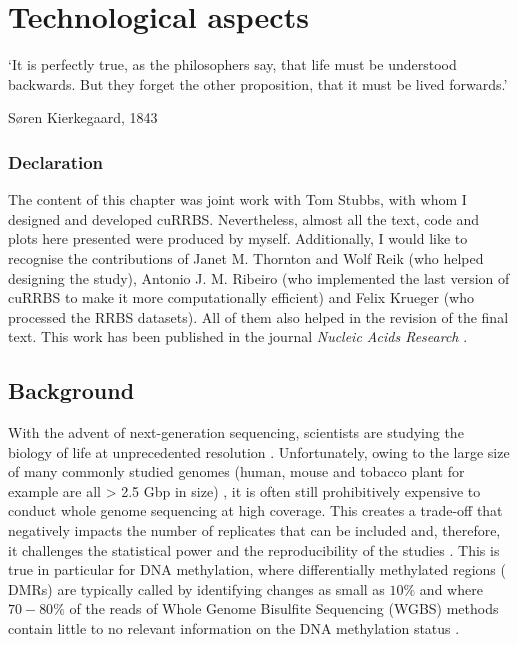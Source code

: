 
\chapter{Technological aspects} \label{c:4}

\ifpdf
	\graphicspath{{Chapter4/Figs/pdf/}}
\else
	\graphicspath{{Chapter4/Figs/svg/}}
\fi

\epigraph{`It is perfectly true, as the philosophers say, that life must be understood backwards. But they forget the other proposition, that it must be lived forwards.'}{Søren Kierkegaard, 1843 \cite{Kierkegaard1843}}

\subsection*{Declaration} 

\footnotesize

The content of this chapter was joint work with Tom Stubbs, with whom I designed and developed cuRRBS. Nevertheless, almost all the text, code and plots here presented were produced by myself. Additionally, I would like to recognise the contributions of Janet M. Thornton and Wolf Reik (who helped designing the study), Antonio J. M. Ribeiro (who implemented the last version of cuRRBS to make it more computationally efficient) and Felix Krueger (who processed the RRBS datasets). All of them also helped in the revision of the final text. This work has been published in the journal \textit{Nucleic Acids Research} \cite{Martin-Herranz2017a}.

\normalsize

\section{Background} \label{s:4.1}

\smallskip

With the advent of next-generation sequencing, scientists are studying the biology of life at unprecedented resolution \cite{Shendure2008}. Unfortunately, owing to the large size of many commonly studied genomes (human, mouse and tobacco plant for example are all > 2.5 \acrshort{Gbp} in size) \cite{Consortium2001,Consortium2002,Sierro2014}, it is often still prohibitively expensive to conduct whole genome sequencing at high coverage. This creates a trade-off that negatively impacts the number of replicates that can be included and, therefore, it challenges the statistical power and the reproducibility of the studies \cite{Fumagalli2013,Wu2015}. This is true in particular for \acrshort{DNA} methylation, where differentially methylated regions ( \acrshort{DMRs}) are typically called by identifying changes as small as $10\%$ and where $70-80\%$ of the reads of Whole Genome Bisulfite Sequencing (\acrshort{WGBS}) methods contain little to no relevant information on the DNA methylation status \cite{Ziller2013}.

